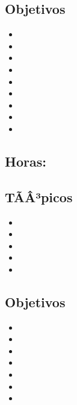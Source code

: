 \subsection*{Objetivos}
\begin{itemize}
	\item \OSCINCOObjUNO
	\item \OSCINCOObjDOS
	\item \OSCINCOObjTRES
	\item \OSCINCOObjCUATRO
	\item \OSCINCOObjCINCO
	\item \OSCINCOObjSEIS
	\item \OSCINCOObjSIETE
	\item \OSCINCOObjOCHO
	\item \OSCINCOObjNUEVE
\end{itemize}

\subsection{\OSSEISDef}\label{sec:BOK-OS6}
\subsection*{Horas: \OSSEISHours}

\subsection*{TÃÂ³picos}
\begin{itemize}
	\item \OSSEISTopicCaracteristicas
	\item \OSSEISTopicDiferencias
	\item \OSSEISTopicEstrategias
	\item \OSSEISTopicAcceso
	\item \OSSEISTopicRecuperacion
\end{itemize}

\subsection*{Objetivos}
\begin{itemize}
	\item \OSSEISObjUNO
	\item \OSSEISObjDOS
	\item \OSSEISObjTRES
	\item \OSSEISObjCUATRO
	\item \OSSEISObjCINCO
	\item \OSSEISObjSEIS
	\item \OSSEISObjSIETE
\end{itemize}

